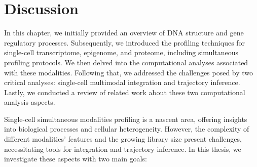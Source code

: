 


\section{Discussion}
\label{background:Discussion}
In this chapter, we initially provided an overview of DNA structure and gene regulatory processes. Subsequently, we introduced the profiling techniques for single-cell transcriptome, epigenome, and proteome, including simultaneous profiling protocols. We then delved into the computational analyses associated with these modalities. Following that, we addressed the challenges posed by two critical analyses: single-cell multimodal integration and trajectory inference. Lastly, we conducted a review of related work about these two computational analysis aspects.


Single-cell simultaneous modalities profiling is a nascent area, offering insights into biological processes and cellular heterogeneity. However, the complexity of different modalities' features and the growing library size present challenges, necessitating tools for integration and trajectory inference. In this thesis, we investigate these aspects with two main goals:



